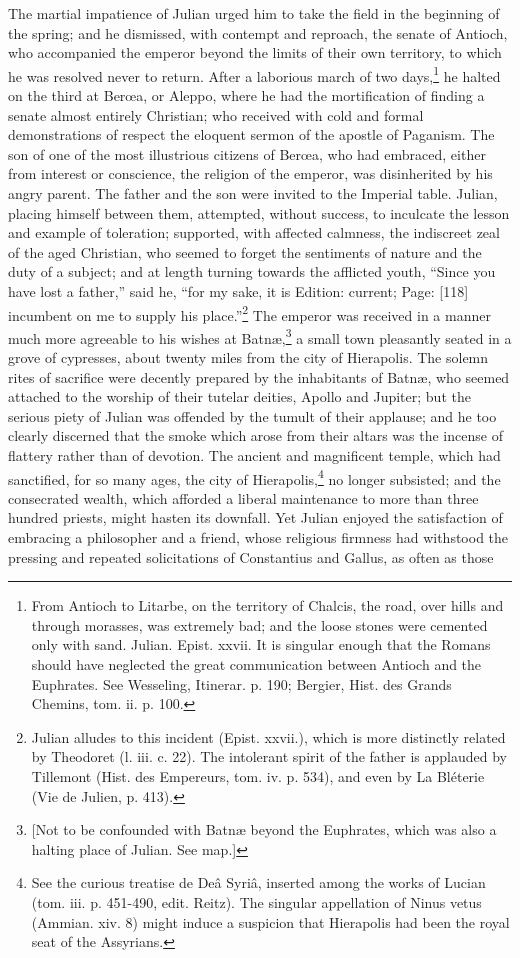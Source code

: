 The martial impatience of Julian urged him to take the field in the beginning of the spring; and he dismissed, with contempt and reproach, the senate of Antioch, who accompanied the emperor beyond the limits of their own territory, to which he was resolved never to return. After a laborious march of two days,\footnote{From Antioch to Litarbe, on the territory of Chalcis, the road, over hills and through morasses, was extremely bad; and the loose stones were cemented only with sand. Julian. Epist. xxvii. It is singular enough that the Romans should have neglected the great communication between Antioch and the Euphrates. See Wesseling, Itinerar. p. 190; Bergier, Hist. des Grands Chemins, tom. ii. p. 100.} he halted on the third at Berœa, or Aleppo, where he had the mortification of finding a senate almost entirely Christian; who received with cold and formal demonstrations of respect the eloquent sermon of the apostle of Paganism. The son of one of the most illustrious citizens of Berœa, who had embraced, either from interest or conscience, the religion of the emperor, was disinherited by his angry parent. The father and the son were invited to the Imperial table. Julian, placing himself between them, attempted, without success, to inculcate the lesson and example of toleration; supported, with affected calmness, the indiscreet zeal of the aged Christian, who seemed to forget the sentiments of nature and the duty of a subject; and at length turning towards the afflicted youth, \texthebrew{“}Since you have lost a father,\texthebrew{}” said he, \texthebrew{“}for my sake, it is Edition: current; Page: [118] incumbent on me to supply his place.\texthebrew{}”\footnote{Julian alludes to this incident (Epist. xxvii.), which is more distinctly related by Theodoret (l. iii. c. 22). The intolerant spirit of the father is applauded by Tillemont (Hist. des Empereurs, tom. iv. p. 534), and even by La Bléterie (Vie de Julien, p. 413).} The emperor was received in a manner much more agreeable to his wishes at Batnæ,\footnote{[Not to be confounded with Batnæ beyond the Euphrates, which was also a halting place of Julian. See map.]} a small town pleasantly seated in a grove of cypresses, about twenty miles from the city of Hierapolis. The solemn rites of sacrifice were decently prepared by the inhabitants of Batnæ, who seemed attached to the worship of their tutelar deities, Apollo and Jupiter; but the serious piety of Julian was offended by the tumult of their applause; and he too clearly discerned that the smoke which arose from their altars was the incense of flattery rather than of devotion. The ancient and magnificent temple, which had sanctified, for so many ages, the city of Hierapolis,\footnote{See the curious treatise de Deâ Syriâ, inserted among the works of Lucian (tom. iii. p. 451-490, edit. Reitz). The singular appellation of Ninus vetus (Ammian. xiv. 8) might induce a suspicion that Hierapolis had been the royal seat of the Assyrians.} no longer subsisted; and the consecrated wealth, which afforded a liberal maintenance to more than three hundred priests, might hasten its downfall. Yet Julian enjoyed the satisfaction of embracing a philosopher and a friend, whose religious firmness had withstood the pressing and repeated solicitations of Constantius and Gallus, as often as those 